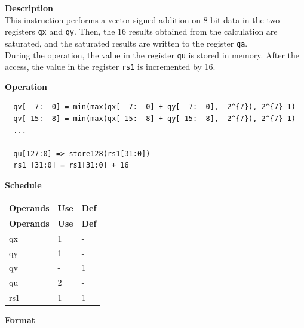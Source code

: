 \textbf{Description}\\
This instruction performs a vector signed addition on 8-bit data in the two registers \lstinline{qx} and \lstinline{qy}. Then, the 16 results obtained from the calculation are saturated, and the saturated results are written to the register \lstinline{qa}. \\ During the operation, the value in the register \lstinline{qu} is stored in memory. After the access, the value in the register \lstinline{rs1} is incremented by 16.

\textbf{Operation}\\
\begin{lstlisting}
  qv[  7:  0] = min(max(qx[  7:  0] + qy[  7:  0], -2^{7}), 2^{7}-1)
  qv[ 15:  8] = min(max(qx[ 15:  8] + qy[ 15:  8], -2^{7}), 2^{7}-1)
  ...

  qu[127:0] => store128(rs1[31:0])
  rs1 [31:0] = rs1[31:0] + 16
\end{lstlisting}

\textbf{Schedule}\\
\begin{longtable}[c]{|l|l|l|}
    \hline
    \rowcolor{lightgray}
    \textbf{Operands} & \textbf{Use} & \textbf{Def} \\\hline
    \endfirsthead
    \hline
    \rowcolor{lightgray}
     \textbf{Operands} & \textbf{Use} & \textbf{Def} \\\hline
    \endhead
    \hline
    \endfoot

    qx & 1 & - \\\hline
  qy & 1 & - \\\hline
     qv & - & 1 \\\hline
     qu & 2 & - \\\hline
     rs1 & 1 & 1

\end{longtable}

\textbf{Format}\\

